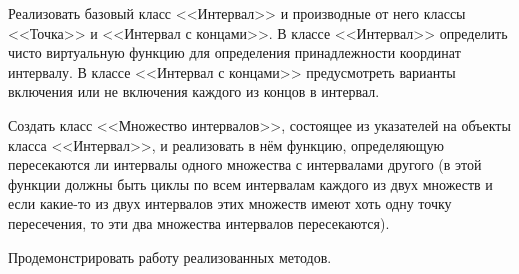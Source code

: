 Реализовать базовый класс <<Интервал>> и производные от
него классы <<Точка>> и <<Интервал с концами>>.
В классе
<<Интервал>> определить чисто виртуальную функцию для
определения принадлежности координат интервалу.
В
классе <<Интервал с концами>> предусмотреть варианты
включения или не включения каждого из концов в интервал.

Создать класс <<Множество интервалов>>, состоящее из
указателей на объекты класса <<Интервал>>, и реализовать в
нём функцию, определяющую пересекаются ли интервалы
одного множества с интервалами другого (в этой функции
должны быть циклы по всем интервалам каждого из двух
множеств и если какие-то из двух интервалов этих множеств
имеют хоть одну точку пересечения, то эти два множества
интервалов пересекаются).

Продемонстрировать работу
реализованных методов.
